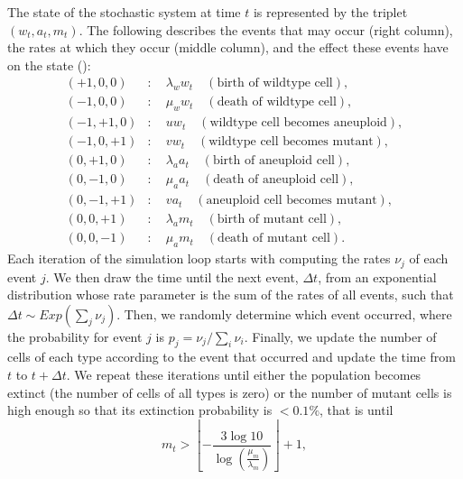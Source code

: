 \documentclass[12pt]{extarticle}
\begin{document}
The state of the stochastic system at time $t$ is represented by the triplet $\left(w_t,a_t,m_t\right)$. The following describes the events that may occur (right column), the rates at which they occur (middle column), and the effect these events have on the state ():
\begin{subequations}
\begin{flalign*}
(+1,0,0)&:\quad \lambda_ww_t\quad\left(\text{birth of wildtype cell}\right),\\
(-1,0,0)&:\quad \mu_ww_t\quad\left(\text{death of wildtype cell}\right),\\
(-1,+1,0)&:\quad uw_t\quad\left(\text{wildtype cell becomes aneuploid}\right),\\
(-1,0,+1)&:\quad vw_t\quad\left(\text{wildtype cell becomes mutant}\right),\\
(0,+1,0)&:\quad \lambda_aa_t\quad\left(\text{birth of aneuploid cell}\right),\\
(0,-1,0)&:\quad \mu_aa_t\quad\left(\text{death of aneuploid cell}\right),\\
(0,-1,+1)&:\quad va_t\quad\left(\text{aneuploid cell becomes mutant}\right),\\
(0,0,+1)&:\quad \lambda_am_t\quad\left(\text{birth of mutant cell}\right),\\
(0,0,-1)&:\quad \mu_am_t\quad\left(\text{death of mutant cell}\right).
\end{flalign*}
\end{subequations}
Each iteration of the simulation loop starts with computing the rates $\nu_j$ of each event $j$.
We then draw the time until the next event, $\Delta t$, from an exponential distribution whose rate parameter is the sum of the rates of all events, such that $\Delta t \sim \textit{Exp}(\sum_j \nu_j)$.
Then, we randomly determine which event occurred, where the probability for event $j$ is $p_j=\nu_j/\sum_i \nu_i$.
Finally, we update the number of cells of each type according to the event that occurred and update the time from $t$ to $t+\Delta t$.
We repeat these iterations until either the population becomes extinct (the number of cells of all types is zero) or the number of mutant cells is high enough so that its extinction probability is $<0.1\%$, that is until
\begin{equation*}
m_t>\left\lfloor-\frac{3\log10}{\log\left(\frac{\mu_m}{\lambda_m}\right)}\right\rfloor+1,
\end{equation*}

\end{document}
